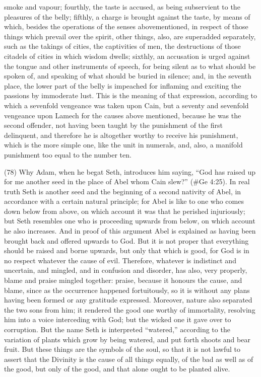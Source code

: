 smoke and vapour; fourthly, the taste is accused, as being subservient to the pleasures of the
belly; fifthly, a charge is brought against the taste, by means of which, besides the operations of
the senses abovementioned, in respect of those things which prevail over the spirit, other things,
also, are superadded separately, such as the takings of cities, the captivities of men, the
destructions of those citadels of cities in which wisdom dwells; sixthly, an accusation is urged
against the tongue and other instruments of speech, for being silent as to what should be spoken
of, and speaking of what should be buried in silence; and, in the seventh place, the lower part of the
belly is impeached for inflaming and exciting the passions by immoderate lust. This is the meaning
of that expression, according to which a sevenfold vengeance was taken upon Cain, but a seventy
and sevenfold vengeance upon Lamech for the causes above mentioned, because he was the
second offender, not having been taught by the punishment of the first delinquent, and therefore he
is altogether worthy to receive his punishment, which is the more simple one, like the unit in
numerals, and, also, a manifold punishment too equal to the number ten.

(78) Why Adam, when he begat Seth, introduces him saying, ``God has raised up for me another
seed in the place of Abel whom Cain slew?'' (\#Ge 4:25). In real truth Seth is another seed and
the beginning of a second nativity of Abel, in accordance with a certain natural principle; for Abel is
like to one who comes down below from above, on which account it was that he perished
injuriously; but Seth resembles one who is proceeding upwards from below, on which account he
also increases. And in proof of this argument Abel is explained as having been brought back and
offered upwards to God. But it is not proper that everything should be raised and borne upwards,
but only that which is good, for God is in no respect whatever the cause of evil. Therefore,
whatever is indistinct and uncertain, and mingled, and in confusion and disorder, has also, very
properly, blame and praise mingled together: praise, because it honours the cause, and blame,
since as the occurrence happened fortuitously, so it is without any plans having been formed or
any gratitude expressed. Moreover, nature also separated the two sons from him; it rendered the
good one worthy of immortality, resolving him into a voice interceding with God; but the wicked one
it gave over to corruption. But the name Seth is interpreted ``watered,'' according to the variation of
plants which grow by being watered, and put forth shoots and bear fruit. But these things are the
symbols of the soul, so that it is not lawful to assert that the Divinity is the cause of all things
equally, of the bad as well as of the good, but only of the good, and that alone ought to be planted
alive.

